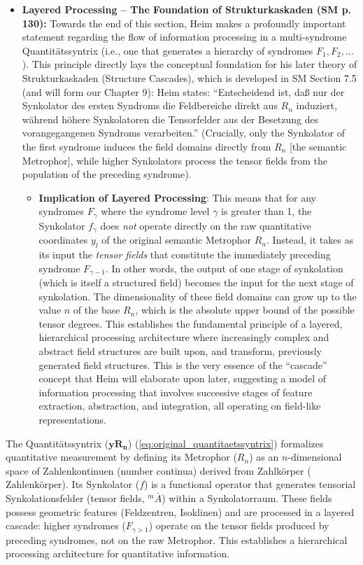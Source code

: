 \documentclass[12pt]{article}
\newcommand{\q}[1]{\enquote{#1}}
\newcommand{\syndrom}{F}
\newcommand{\quantitaetssyntrix}{\bm{yR_n}}
\newcommand{\zahlenkoerper}{\text{Zahlenkörper}}
\begin{document}
\begin{itemize}
    \item \textbf{Layered Processing – The Foundation of Strukturkaskaden (SM p. 130):}
    Towards the end of this section, Heim makes a profoundly important statement regarding the flow of information processing in a multi-syndrome Quantitätssyntrix (i.e., one that generates a hierarchy of syndromes \( \syndrom_1, \syndrom_2, \dots \)). This principle directly lays the conceptual foundation for his later theory of Strukturkaskaden (Structure Cascades), which is developed in SM Section 7.5 (and will form our Chapter 9):
    Heim states: \q{Entscheidend ist, daß nur der Synkolator des ersten Syndroms die Feldbereiche direkt aus \( R_n \) induziert, während höhere Synkolatoren die Tensorfelder aus der Besetzung des vorangegangenen Syndroms verarbeiten.} (Crucially, only the Synkolator of the first syndrome induces the field domains directly from \( R_n \) [the semantic Metrophor], while higher Synkolators process the tensor fields from the population of the preceding syndrome).
    \begin{itemize}
        \item \textbf{Implication of Layered Processing}: This means that for any syndromes \( \syndrom_\gamma \) where the syndrome level \( \gamma \) is greater than 1, the Synkolator \( f_\gamma \) does \textit{not} operate directly on the raw quantitative coordinates \( y_l \) of the original semantic Metrophor \( R_n \). Instead, it takes as its input the \textit{tensor fields} that constitute the immediately preceding syndrome \( \syndrom_{\gamma-1} \). In other words, the output of one stage of synkolation (which is itself a structured field) becomes the input for the next stage of synkolation. The dimensionality of these field domains can grow up to the value $n$ of the base $R_n$, which is the absolute upper bound of the possible tensor degrees. This establishes the fundamental principle of a layered, hierarchical processing architecture where increasingly complex and abstract field structures are built upon, and transform, previously generated field structures. This is the very essence of the \q{cascade} concept that Heim will elaborate upon later, suggesting a model of information processing that involves successive stages of feature extraction, abstraction, and integration, all operating on field-like representations.
    \end{itemize}
\end{itemize}

The Quantitätssyntrix (\(\quantitaetssyntrix\)) (\eqref{eq:original_quantitaetssyntrix}) formalizes quantitative measurement by defining its Metrophor (\(R_n\)) as an \(n\)-dimensional space of Zahlenkontinuen (number continua) derived from Zahlkörper (\(\zahlenkoerper\)). Its Synkolator (\(f\)) is a functional operator that generates tensorial Synkolationsfelder (tensor fields, \(^m\overline{A}\)) within a Synkolatorraum. These fields possess geometric features (Feldzentren, Isoklinen) and are processed in a layered cascade: higher syndromes (\(\syndrom_{\gamma > 1}\)) operate on the tensor fields produced by preceding syndromes, not on the raw Metrophor. This establishes a hierarchical processing architecture for quantitative information.
\end{document}

